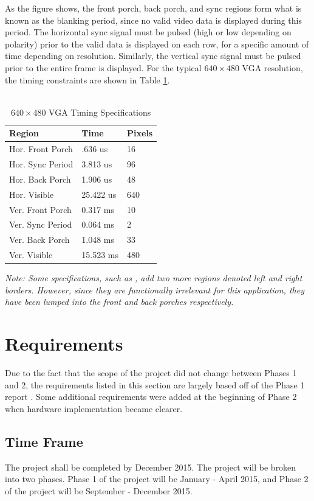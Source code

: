 \documentclass[11pt]{article} %
\begin{document}
As the figure shows, the front porch, back porch, and sync regions form what is known as the blanking period, since no valid video data is displayed during this period. The horizontal sync signal must be pulsed (high or low depending on polarity) prior to the valid data is displayed on each row, for a specific amount of time depending on resolution. Similarly, the vertical sync signal must be pulsed prior to the entire frame is displayed. For the typical $640 \times 480$ VGA resolution, the timing constraints are shown in Table \ref{table:vga}. \\\\
\FloatBarrier
\begin{table}[h]
\centering
\caption{$640 \times 480$ VGA Timing Specifications \cite{vga}}
\label{table:vga}
 \begin{tabular}{ | p{4cm} | p{4cm} | p{4cm} |} \hline
 \textbf{Region} & \textbf{Time} & \textbf{Pixels} \\ \hline
Hor. Front Porch & .636 us & 16 \\ \hline
Hor. Sync Period & 3.813 us & 96\\ \hline
Hor. Back Porch & 1.906 us & 48\\ \hline
Hor. Visible & 25.422 us & 640\\ \hline
Ver. Front Porch & 0.317 ms & 10 \\ \hline
Ver. Sync Period & 0.064 ms & 2 \\ \hline
Ver. Back Porch & 1.048 ms & 33 \\ \hline
Ver. Visible & 15.523 ms & 480\\ \hline
\end{tabular}
\end{table}
\FloatBarrier
\textit{Note: Some specifications, such as \cite{vga}, add two more regions denoted left and right borders. However, since they are functionally irrelevant for this application, they have been lumped into the front and back porches respectively.}
\section{Requirements}
Due to the fact that the scope of the project did not change between Phases 1 and 2, the requirements listed in this section are largely based off of the Phase 1 report \cite{phase1}. Some additional requirements were added at the beginning of Phase 2 when hardware implementation became clearer.
\subsection{Time Frame}
The project shall be completed by December 2015. The project will be broken into two phases. Phase 1 of the project will be January - April 2015, and Phase 2 of the project will be September - December 2015.
\end{document}

